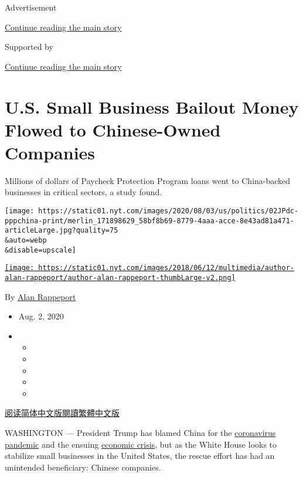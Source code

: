 Advertisement

\protect\hyperlink{after-top}{Continue reading the main story}

Supported by

\protect\hyperlink{after-sponsor}{Continue reading the main story}

\hypertarget{us-small-business-bailout-money-flowed-to-chinese-owned-companies}{%
\section{U.S. Small Business Bailout Money Flowed to Chinese-Owned
Companies}\label{us-small-business-bailout-money-flowed-to-chinese-owned-companies}}

Millions of dollars of Paycheck Protection Program loans went to
China-backed businesses in critical sectors, a study found.

\texttt{[image: https://static01.nyt.com/images/2020/08/03/us/politics/02JPdc-pppchina-print/merlin\_171898629\_58bf8b69-8779-4aaa-acce-8e43ad81a471-articleLarge.jpg?quality=75\\\&auto=webp\\\&disable=upscale]}

\href{https://www.nytimes.com/by/alan-rappeport}{\texttt{[image: https://static01.nyt.com/images/2018/06/12/multimedia/author-alan-rappeport/author-alan-rappeport-thumbLarge-v2.png]}}

By \href{https://www.nytimes.com/by/alan-rappeport}{Alan Rappeport}

\begin{itemize}
\item
  Aug. 2, 2020
\item
  \begin{itemize}
  \item
  \item
  \item
  \item
  \item
  \end{itemize}
\end{itemize}

\href{https://cn.nytimes.com/usa/20200803/virus-china-ppp-small-business-loans/}{阅读简体中文版}\href{https://cn.nytimes.com/usa/20200803/virus-china-ppp-small-business-loans/zh-hant/}{閱讀繁體中文版}

WASHINGTON --- President Trump has blamed China for the
\href{https://www.nytimes.com/news-event/coronavirus}{coronavirus
pandemic} and the ensuing
\href{https://www.nytimes.com/2020/07/30/business/economy/q2-gdp-coronavirus-economy.html}{economic
crisis}, but as the White House looks to stabilize small businesses in
the United States, the rescue effort has had an unintended beneficiary:
Chinese companies.

